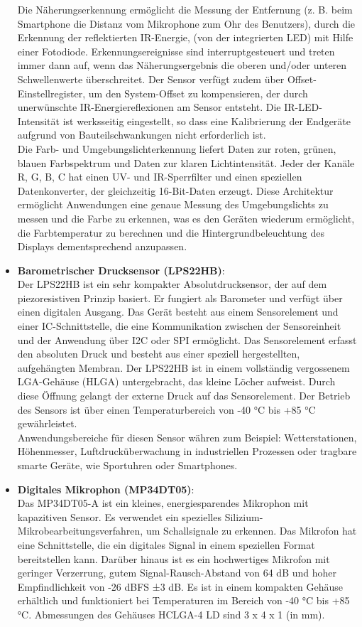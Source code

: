 \begin{itemize}
	Die Näherungserkennung ermöglicht die Messung der Entfernung (z. B. beim Smartphone die Distanz vom Mikrophone zum Ohr des Benutzers), durch die Erkennung der reflektierten IR-Energie, (von der integrierten LED) mit Hilfe einer Fotodiode. Erkennungsereignisse sind interruptgesteuert und treten immer dann auf, wenn das Näherungsergebnis die oberen und/oder unteren Schwellenwerte überschreitet. Der Sensor verfügt zudem über Offset-Einstellregister, um den System-Offset zu kompensieren, der durch unerwünschte IR-Energiereflexionen am Sensor entsteht. Die IR-LED-Intensität ist werksseitig eingestellt, so dass eine Kalibrierung der Endgeräte aufgrund von Bauteilschwankungen nicht erforderlich ist. \\
	Die Farb- und Umgebungslichterkennung liefert Daten zur roten, grünen, blauen Farbspektrum und Daten zur klaren Lichtintensität. Jeder der Kanäle R, G, B, C hat einen UV- und IR-Sperrfilter und einen speziellen Datenkonverter, der gleichzeitig 16-Bit-Daten erzeugt. Diese Architektur ermöglicht Anwendungen eine genaue Messung des Umgebungslichts zu messen und die Farbe zu erkennen, was es den Geräten wiederum ermöglicht, die Farbtemperatur zu berechnen und die Hintergrundbeleuchtung des Displays dementsprechend anzupassen.\cite{Avago:2015}
	\\
	\item \textbf{Barometrischer Drucksensor (LPS22HB)}:\\
	Der LPS22HB ist ein sehr kompakter Absolutdrucksensor, der auf dem piezoresistiven Prinzip basiert. Er fungiert als Barometer und verfügt über einen digitalen Ausgang. Das Gerät besteht aus einem Sensorelement und einer IC-Schnittstelle, die eine Kommunikation zwischen der Sensoreinheit und der Anwendung über I2C oder SPI ermöglicht.	Das Sensorelement erfasst den absoluten Druck und besteht aus einer speziell hergestellten, aufgehängten Membran. Der LPS22HB ist in einem vollständig vergossenem LGA-Gehäuse (HLGA) untergebracht, das kleine Löcher aufweist. Durch diese Öffnung gelangt der externe Druck auf das Sensorelement. Der Betrieb des Sensors ist über einen Temperaturbereich von -40 °C bis +85 °C gewährleistet.\cite{StmicElec.2017}
	\\Anwendungsbereiche für diesen Sensor währen zum Beispiel: Wetterstationen, Höhenmesser, Luftdrucküberwachung in industriellen Prozessen oder tragbare smarte Geräte, wie Sportuhren oder Smartphones.
	\\
	\item \textbf{Digitales Mikrophon (MP34DT05)}:\\
	Das MP34DT05-A ist ein kleines, energiesparendes Mikrophon mit kapazitiven Sensor. Es verwendet ein spezielles Silizium-Mikrobearbeitungsverfahren, um Schallsignale zu erkennen. Das Mikrofon hat eine Schnittstelle, die ein digitales Signal in einem speziellen Format bereitstellen kann. Darüber hinaus ist es ein hochwertiges Mikrofon mit geringer Verzerrung, gutem Signal-Rausch-Abstand von 64 dB und hoher Empfindlichkeit von -26 dBFS ±3 dB. Es ist in einem kompakten Gehäuse erhältlich und funktioniert bei Temperaturen im Bereich von -40 °C bis +85 °C. Abmessungen des Gehäuses HCLGA-4 LD sind 3 x 4 x 1 (in mm).\cite{StmicElec.2021}
	
\end{itemize}
